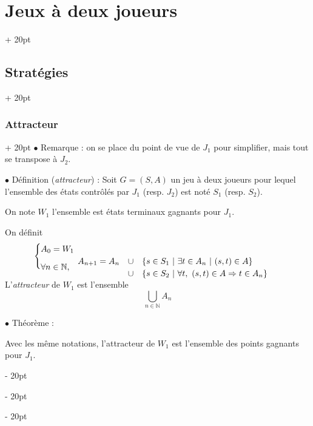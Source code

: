 \documentclass[a4paper, 12pt, twoside]{article}
\newcommand{\N}{\mathbb{N}} %
\newcommand{\set}[1]{\left\{ #1 \right\}}
\newcommand{\ind}[1][20pt]{\advance\leftskip + #1}
\newcommand{\deind}[1][20pt]{\advance\leftskip - #1}
\newenvironment{indt}[2][20pt]{#2 \par \ind[#1]}{\par \deind} %
\begin{document}
\begin{indt}{\section{Jeux à deux joueurs}}
\begin{indt}{\subsection{Stratégies}}
            \vspace{12pt}
            
            \begin{indt}{\subsubsection{Attracteur}}
                $\bullet$ Remarque : on se place du point de vue de $J_1$ pour simplifier, mais tout se transpose à $J_2$.

                $\bullet$ Définition (\emph{attracteur}) : Soit $G = (S, A)$ un jeu à deux joueurs pour lequel l'ensemble des états contrôlés par $J_1$ (resp. $J_2$) est noté $S_1$ (resp. $S_2$).

                On note $W_1$ l'ensemble est états terminaux gagnants pour $J_1$.

                On définit
                \[
                    \begin{cases}
                        A_0 = W_1
                        \\
                        \forall n \in \N,\
                        \begin{array}{rcl}
                            A_{n + 1} = A_n
                            &\cup&
                            \set{s \in S_1\ |\ \exists t \in A_n\ |\ (s, t) \in A}
                            \\
                            &\cup& \set{s \in S_2\ |\ \forall t,\ (s, t) \in A \Rightarrow t \in A_n}
                        \end{array}
                        \vspace{-12pt}
                    \end{cases}
                \]

                L'\emph{attracteur} de $W_1$ est l'ensemble
                \[
                    \bigcup_{n \in \N} A_n
                \]

                \vspace{12pt}
                
                $\bullet$ Théorème :
                \begin{emphBox}
                    Avec les même notations, l'attracteur de $W_1$ est l'ensemble des points gagnants pour $J_1$.
                \end{emphBox}

                \vspace{6pt}
                

\end{indt}
\end{indt}
\end{indt}
\end{document}
